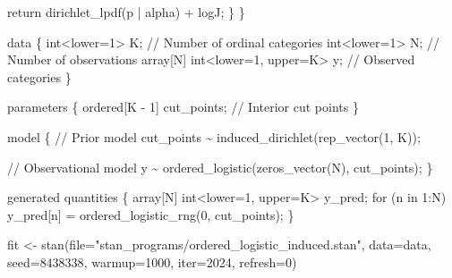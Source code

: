 \documentclass[
  letterpaper,
  DIV=11,
  numbers=noendperiod]{scrartcl}
\newenvironment{Shaded}{\begin{snugshade}}{\end{snugshade}}
\newcommand{\AttributeTok}[1]{\textcolor[rgb]{0.40,0.45,0.13}{#1}}
\newcommand{\CommentTok}[1]{\textcolor[rgb]{0.37,0.37,0.37}{#1}}
\newcommand{\ControlFlowTok}[1]{\textcolor[rgb]{0.00,0.23,0.31}{#1}}
\newcommand{\DataTypeTok}[1]{\textcolor[rgb]{0.68,0.00,0.00}{#1}}
\newcommand{\DecValTok}[1]{\textcolor[rgb]{0.68,0.00,0.00}{#1}}
\newcommand{\FunctionTok}[1]{\textcolor[rgb]{0.28,0.35,0.67}{#1}}
\newcommand{\KeywordTok}[1]{\textcolor[rgb]{0.00,0.23,0.31}{#1}}
\newcommand{\NormalTok}[1]{\textcolor[rgb]{0.00,0.23,0.31}{#1}}
\newcommand{\OtherTok}[1]{\textcolor[rgb]{0.00,0.23,0.31}{#1}}
\newcommand{\StringTok}[1]{\textcolor[rgb]{0.13,0.47,0.30}{#1}}
\begin{document}
\begin{codelisting}
\begin{Shaded}
\begin{Highlighting}[]
    \ControlFlowTok{return}\NormalTok{ dirichlet\_lpdf(p | alpha) + logJ;}
\NormalTok{  \}}
\NormalTok{\}}

\KeywordTok{data}\NormalTok{ \{}
  \DataTypeTok{int}\NormalTok{\textless{}}\KeywordTok{lower}\NormalTok{=}\DecValTok{1}\NormalTok{\textgreater{} K;                   }\CommentTok{// Number of ordinal categories}
  \DataTypeTok{int}\NormalTok{\textless{}}\KeywordTok{lower}\NormalTok{=}\DecValTok{1}\NormalTok{\textgreater{} N;                   }\CommentTok{// Number of observations}
  \DataTypeTok{array}\NormalTok{[N] }\DataTypeTok{int}\NormalTok{\textless{}}\KeywordTok{lower}\NormalTok{=}\DecValTok{1}\NormalTok{, }\KeywordTok{upper}\NormalTok{=K\textgreater{} y; }\CommentTok{// Observed categories}
\NormalTok{\}}

\KeywordTok{parameters}\NormalTok{ \{}
  \DataTypeTok{ordered}\NormalTok{[K {-} }\DecValTok{1}\NormalTok{] cut\_points; }\CommentTok{// Interior cut points}
\NormalTok{\}}

\KeywordTok{model}\NormalTok{ \{}
  \CommentTok{// Prior model}
\NormalTok{  cut\_points \textasciitilde{} induced\_dirichlet(rep\_vector(}\DecValTok{1}\NormalTok{, K));}

  \CommentTok{// Observational model}
\NormalTok{  y \textasciitilde{} ordered\_logistic(zeros\_vector(N), cut\_points);}
\NormalTok{\}}

\KeywordTok{generated quantities}\NormalTok{ \{}
  \DataTypeTok{array}\NormalTok{[N] }\DataTypeTok{int}\NormalTok{\textless{}}\KeywordTok{lower}\NormalTok{=}\DecValTok{1}\NormalTok{, }\KeywordTok{upper}\NormalTok{=K\textgreater{} y\_pred;}
  \ControlFlowTok{for}\NormalTok{ (n }\ControlFlowTok{in} \DecValTok{1}\NormalTok{:N)}
\NormalTok{    y\_pred[n] = ordered\_logistic\_rng(}\DecValTok{0}\NormalTok{, cut\_points);}
\NormalTok{\}}
\end{Highlighting}
\end{Shaded}

\end{codelisting}

\begin{Shaded}
\begin{Highlighting}[]
\NormalTok{fit }\OtherTok{\textless{}{-}} \FunctionTok{stan}\NormalTok{(}\AttributeTok{file=}\StringTok{"stan\_programs/ordered\_logistic\_induced.stan"}\NormalTok{,}
            \AttributeTok{data=}\NormalTok{data, }\AttributeTok{seed=}\DecValTok{8438338}\NormalTok{,}
            \AttributeTok{warmup=}\DecValTok{1000}\NormalTok{, }\AttributeTok{iter=}\DecValTok{2024}\NormalTok{, }\AttributeTok{refresh=}\DecValTok{0}\NormalTok{)}
\end{Highlighting}
\end{Shaded}
\end{document}
